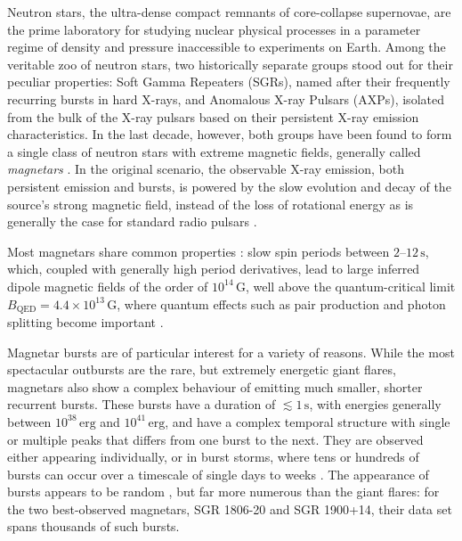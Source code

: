 \documentclass[12pt]{emulateapj}
\begin{document}
Neutron stars, the ultra-dense compact remnants of core-collapse supernovae, are the prime laboratory for studying nuclear 
physical processes in a parameter regime of density and pressure inaccessible to experiments on Earth. 
Among the veritable zoo of neutron stars, two historically separate groups stood out for their peculiar properties: Soft Gamma Repeaters (SGRs), named after their frequently recurring bursts in hard X-rays, and Anomalous X-ray Pulsars (AXPs), isolated from the bulk of the X-ray pulsars based on their persistent X-ray
emission characteristics. In the last decade, however, both groups have been found to form a single class of neutron stars with extreme magnetic fields, generally called {\it magnetars} \citep{duncan1992,thompson1995,kouveliotou1998}. In the original scenario, the observable X-ray emission, both persistent emission and bursts, 
is powered by the slow evolution and decay of the source's strong magnetic field, instead of the loss of rotational energy as is generally the case for standard radio pulsars \citep{thompson1995,thompson2001}. 

Most magnetars share common properties \citep[for general overviews, see ][]{woods2006,mereghetti2011}: slow spin periods between
$2$--$12\,\mathrm{s}$, which, coupled with generally high period derivatives, lead to large inferred dipole magnetic fields of
the order of $10^{14} \, \mathrm{G}$, well above the quantum-critical limit $B_{\mathrm{QED}} = 4.4 \times 10^{13} \, \mathrm{G}$,
where quantum effects such as pair production and photon splitting become important \citep[although three sources have been 
identified with properties similar to magnetars, but with inferred dipole fields below this limit;][]{vanderhorst2010,esposito2010,rea2010,rea2012,scholz2012,rea2014}. 

Magnetar bursts are of particular interest for a variety of reasons. While the most spectacular outbursts are the rare, but extremely energetic giant flares,
magnetars also show a complex behaviour of emitting much smaller, shorter recurrent bursts. These bursts have a duration of $\lesssim 1\,\mathrm{s}$, with energies
generally between $10^{38}\,\mathrm{erg}$ and $10^{41}\,\mathrm{erg}$, and have a complex temporal structure with single or
multiple peaks that differs from one burst to the next. They are observed either appearing individually, or in burst 
storms, where tens or hundreds of bursts can occur over a timescale of single days to weeks \citep{mazets1999,goetz2006b,israel2008,mereghetti2009,savchenko2010,israel2010,scholz2011,dib2012,vanderhorst2012,vonkienlin2012}. 
The appearance of bursts appears to be random \citep{gogus1999,gogus2000}, but far more numerous than the giant flares: 
for the two best-observed magnetars, SGR 1806-20 and SGR 1900+14, their
data set spans thousands of such bursts. 
\end{document}
